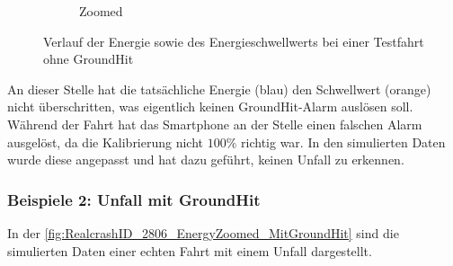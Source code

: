 \begin{figure}[H]
\begin{subfigure}{0.41\textwidth}
		\caption{Zoomed}
		\label{fig:GH_speed_GHEnergy_zoomed_eps}
	\end{subfigure}
	\caption{Verlauf der Energie sowie des Energieschwellwerts bei einer Testfahrt ohne GroundHit}
	\label{fig:GH_Testfahrt_noGroundHit_EnergyZoomed}
\end{figure}



An dieser Stelle hat die tatsächliche Energie (blau) den Schwellwert (orange) nicht überschritten, was eigentlich keinen GroundHit-Alarm auslösen soll. Während der Fahrt hat das Smartphone an der Stelle einen falschen Alarm ausgelöst, da die Kalibrierung nicht $100\%$ richtig war. In den simulierten Daten wurde diese angepasst und hat dazu geführt, keinen Unfall zu erkennen.

\subsubsection{Beispiele 2: Unfall mit GroundHit}
In der \autoref{fig:RealcrashID_2806_EnergyZoomed_MitGroundHit} sind die simulierten Daten einer echten Fahrt mit einem Unfall dargestellt. 

